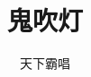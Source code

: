 \documentclass[12pt,oneside]{book}
\begin{document}
\title{鬼吹灯}
\author{天下霸唱}

\makemytitleA
\end{document}
